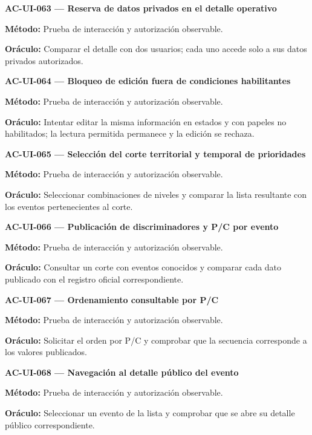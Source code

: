 \documentclass[10pt,letterpaper]{article}
\begin{document}
\noindent\textbf{AC-UI-063 --- Reserva de datos privados en el detalle operativo}\par
\textbf{Método:} Prueba de interacción y autorización observable.\par
\textbf{Oráculo:} Comparar el detalle con dos usuarios; cada uno accede solo a sus datos privados autorizados.\par\vspace{0.45em}
\noindent\textbf{AC-UI-064 --- Bloqueo de edición fuera de condiciones habilitantes}\par
\textbf{Método:} Prueba de interacción y autorización observable.\par
\textbf{Oráculo:} Intentar editar la misma información en estados y con papeles no habilitados; la lectura permitida permanece y la edición se rechaza.\par\vspace{0.45em}
\noindent\textbf{AC-UI-065 --- Selección del corte territorial y temporal de prioridades}\par
\textbf{Método:} Prueba de interacción y autorización observable.\par
\textbf{Oráculo:} Seleccionar combinaciones de niveles y comparar la lista resultante con los eventos pertenecientes al corte.\par\vspace{0.45em}
\noindent\textbf{AC-UI-066 --- Publicación de discriminadores y P/C por evento}\par
\textbf{Método:} Prueba de interacción y autorización observable.\par
\textbf{Oráculo:} Consultar un corte con eventos conocidos y comparar cada dato publicado con el registro oficial correspondiente.\par\vspace{0.45em}
\noindent\textbf{AC-UI-067 --- Ordenamiento consultable por P/C}\par
\textbf{Método:} Prueba de interacción y autorización observable.\par
\textbf{Oráculo:} Solicitar el orden por P/C y comprobar que la secuencia corresponde a los valores publicados.\par\vspace{0.45em}
\noindent\textbf{AC-UI-068 --- Navegación al detalle público del evento}\par
\textbf{Método:} Prueba de interacción y autorización observable.\par
\textbf{Oráculo:} Seleccionar un evento de la lista y comprobar que se abre su detalle público correspondiente.\par\vspace{0.45em}
\end{document}
